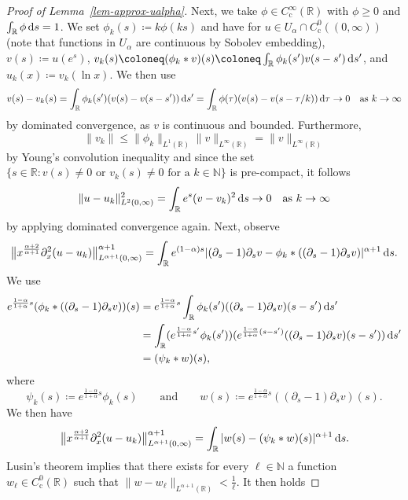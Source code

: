 \documentclass[reqno,12pt]{amsart}
\renewcommand{\d}{\ensuremath{\mathrm{d}}}
\newcommand{\R}{\ensuremath{\mathbb{R}}}
\newcommand{\N}{\ensuremath{\mathbb{N}}}
\renewcommand{\d}{\ensuremath{{\rm d}}}
\numberwithin{equation}{section}
\begin{document}
\begin{proof}[Proof of Lemma~\ref{lem-approx-ualpha}]
%
\bigskip
%

Next, we take $\phi \in C^\infty_\mathrm{c}(\R)$ with $\phi \ge 0$ and $\int_\R \phi \, \d s = 1$. We set $\phi_k(s) \coloneq k \phi(k s)$ and have for $u \in U_\alpha \cap C^0_\mathrm{c}((0,\infty))$ (note that functions in $U_\alpha$ are continuous by Sobolev embedding), $v(s) \coloneq u(e^s)$, $v_k(s) \coloneq (\phi_k * v)(s) \coloneq \int_\R \phi_k(s') v(s-s') \, \d s'$, and $u_k(x) \coloneq v_k(\ln x)$. We then use
%
\[
v(s) - v_k(s) = \int_{\R} \phi_k(s') (v(s)-v(s-s')) \, \d s' = \int_\R \phi(\tau) (v(s)-v(s-\tau/k)) \, \d\tau \to 0 \quad \text{as } k \to \infty
\]
%
by dominated convergence, as $v$ is continuous and bounded. Furthermore,
%
\[
\|v_k\| \le \|\phi_k\|_{L^1(\R)} \|v\|_{L^\infty(\R)} = \|v\|_{L^\infty(\R)}
\]
%
by Young's convolution inequality and since the set $\{s \in \R \colon v(s) \ne 0 \text{ or } v_k(s) \ne 0 \text{ for a } k \in \N\}$ is pre-compact, it follows
%
\[
\|u-u_k\|_{L^2(0,\infty)}^2 = \int_\R e^s (v-v_k)^2 \, \d s \to 0 \quad \text{as } k \to \infty
\]
%
by applying dominated convergence again. Next, observe
%
\begin{align*}
\big\|x^{\frac{\alpha+2}{\alpha+1}} \partial_x^2 (u-u_k)\big\|_{L^{\alpha+1}(0,\infty)}^{\alpha+1} = \int_\R e^{(1-\alpha) s} |(\partial_s - 1) \partial_s v - \phi_k * ((\partial_s - 1) \partial_s v)|^{\alpha+1} \, \d s.
\end{align*}
%
We use
%
\begin{align*}
e^{\frac{1-\alpha}{1+\alpha} s} (\phi_k * ((\partial_s - 1) \partial_s v))(s) &= e^{\frac{1-\alpha}{1+\alpha} s} \int_\R \phi_k(s') ((\partial_s - 1) \partial_s v)(s-s') \, \d s' \\
&= \int_\R (e^{\frac{1-\alpha}{1+\alpha} s'} \phi_k(s')) (e^{\frac{1-\alpha}{1+\alpha} (s-s')} ((\partial_s - 1) \partial_s v)(s-s')) \, \d s' \\
&= (\psi_k * w)(s),
\end{align*}
%
where
%
\[
\psi_k(s) \coloneq e^{\frac{1-\alpha}{1+\alpha} s} \phi_k(s) \qquad \text{and} \qquad w(s) \coloneq e^{\frac{1-\alpha}{1+\alpha} s} ((\partial_s - 1) \partial_s v)(s).
\]
%
We then have
%
\begin{align*}
\big\|x^{\frac{\alpha+2}{\alpha+1}} \partial_x^2 (u-u_k)\big\|_{L^{\alpha+1}(0,\infty)}^{\alpha+1} = \int_\R |w(s) - (\psi_k * w
)(s)|^{\alpha+1} \, \d s.
\end{align*}
%
Lusin's theorem implies that there exists for every $\ell \in \N$ a function $w_\ell \in C^0_\mathrm{c}(\R)$ such that $\|w - w_\ell\|_{L^{\alpha+1}(\R)} < \frac 1 \ell$.  It then holds

\end{proof}
\end{document}
